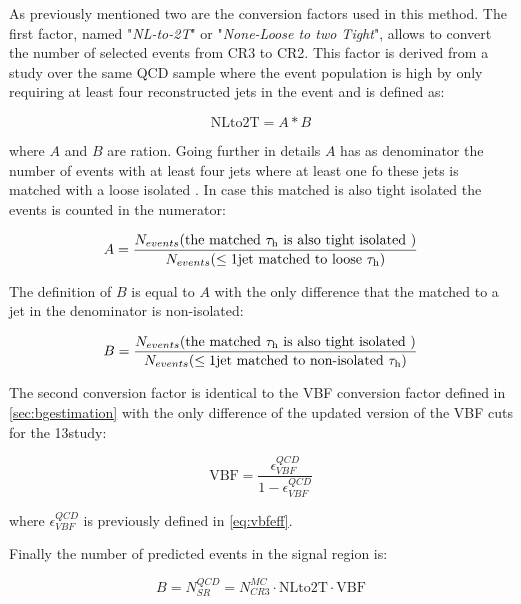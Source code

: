 As previously mentioned two are the conversion factors used in this method. The first factor, named "\textit{NL-to-2T}" or "\textit{None-Loose to two Tight}", allows to convert the number of selected events from CR3 to CR2. This factor is derived from a study over the same QCD sample where the event population is high by only requiring at least four reconstructed jets in the event and is defined as:

\begin{equation}
\text{NLto2T} = A * B
\end{equation}

where $A$ and $B$ are ration. Going further in details $A$ has as denominator the number of events with at least four jets where at least one fo these jets is matched with a loose isolated \hadtau. In case this matched \hadtau is also tight isolated the events is counted in the numerator:

\begin{equation}
A = \dfrac{N_{events}(\text{the matched }\tau_{\text{h}}\text{ is also tight isolated })}{N_{events}(\leq 1\text{jet matched to loose }\tau_{\text{h}})}
\end{equation}

The definition of $B$ is equal to $A$ with the only difference that the \hadtau matched to a jet in the denominator is non-isolated:

\begin{equation}
B = \dfrac{N_{events}(\text{the matched }\tau_{\text{h}}\text{ is also tight isolated })}{N_{events}(\leq 1\text{jet matched to non-isolated }\tau_{\text{h}})}
\end{equation}

The second conversion factor is identical to the VBF conversion factor defined in \autoref{sec:bgestimation} with the only difference of the updated version of the VBF cuts for the 13\tev study:

\begin{equation}
\text{VBF} = \frac{\epsilon^{QCD}_{VBF}}{1 - \epsilon^{QCD}_{VBF}}
\end{equation}

where $\epsilon^{QCD}_{VBF}$ is previously defined in \autoref{eq:vbfeff}. 

Finally the number of predicted events in the signal region is:

\begin{equation}
B = N^{QCD}_{SR} = N^{MC}_{CR3}  \cdot \text{NLto2T} \cdot \text{VBF}
\label{eq::qcdbgpred_13tev}
\end{equation}

